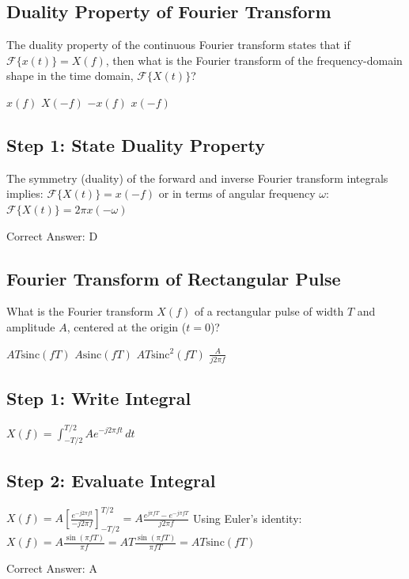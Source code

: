 \clearpage

\subsection{Duality Property of Fourier Transform}

The duality property of the continuous Fourier transform states that if $\mathcal{F}\{x(t)\} = X(f)$, then what is the Fourier transform of the frequency-domain shape in the time domain, $\mathcal{F}\{X(t)\}$?

\begin{choices}
    \choice $x(f)$
    \choice $X(-f)$
    \choice $-x(f)$
    \correctchoice $x(-f)$
\end{choices}

\begin{solution}

\subsection*{Step 1: State Duality Property}
The symmetry (duality) of the forward and inverse Fourier transform integrals implies:
$\mathcal{F}\{X(t)\} = x(-f)$
or in terms of angular frequency $\omega$:
$\mathcal{F}\{X(t)\} = 2\pi x(-\omega)$

Correct Answer: D
\end{solution}

\clearpage

\subsection{Fourier Transform of Rectangular Pulse}

What is the Fourier transform $X(f)$ of a rectangular pulse of width $T$ and amplitude $A$, centered at the origin ($t=0$)?

\begin{choices}
    \correctchoice $A T \text{sinc}(f T)$
    \choice $A \text{sinc}(f T)$
    \choice $A T \text{sinc}^2(f T)$
    \choice $\frac{A}{j 2\pi f}$
\end{choices}

\begin{solution}

\subsection*{Step 1: Write Integral}
$X(f) = \int_{-T/2}^{T/2} A e^{-j 2\pi f t}\, dt$

\subsection*{Step 2: Evaluate Integral}
$X(f) = A \left[ \frac{e^{-j 2\pi f t}}{-j 2\pi f} \right]_{-T/2}^{T/2} = A \frac{e^{j \pi f T} - e^{-j \pi f T}}{j 2\pi f}$
Using Euler's identity:
$X(f) = A \frac{\sin(\pi f T)}{\pi f} = A T \frac{\sin(\pi f T)}{\pi f T} = A T \text{sinc}(f T)$

Correct Answer: A
\end{solution}

